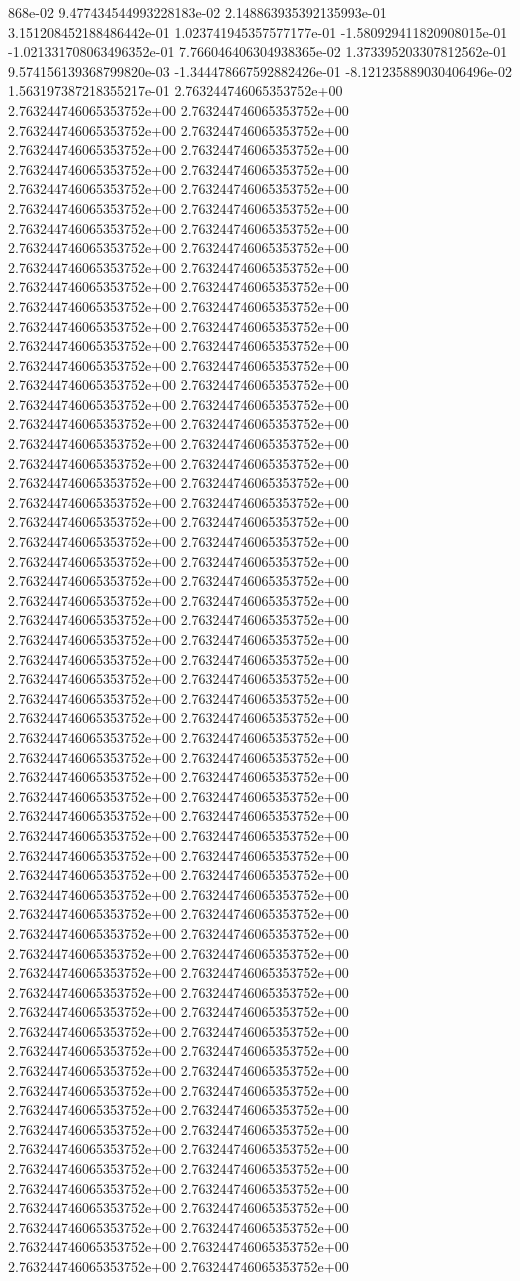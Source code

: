868e-02	9.477434544993228183e-02	2.148863935392135993e-01	3.151208452188486442e-01	1.023741945357577177e-01	-1.580929411820908015e-01	-1.021331708063496352e-01	7.766046406304938365e-02	1.373395203307812562e-01	9.574156139368799820e-03	-1.344478667592882426e-01	-8.121235889030406496e-02	1.563197387218355217e-01
2.763244746065353752e+00	2.763244746065353752e+00	2.763244746065353752e+00	2.763244746065353752e+00	2.763244746065353752e+00	2.763244746065353752e+00	2.763244746065353752e+00	2.763244746065353752e+00	2.763244746065353752e+00	2.763244746065353752e+00	2.763244746065353752e+00	2.763244746065353752e+00	2.763244746065353752e+00	2.763244746065353752e+00	2.763244746065353752e+00	2.763244746065353752e+00	2.763244746065353752e+00	2.763244746065353752e+00	2.763244746065353752e+00	2.763244746065353752e+00	2.763244746065353752e+00	2.763244746065353752e+00	2.763244746065353752e+00	2.763244746065353752e+00	2.763244746065353752e+00	2.763244746065353752e+00	2.763244746065353752e+00	2.763244746065353752e+00	2.763244746065353752e+00	2.763244746065353752e+00	2.763244746065353752e+00	2.763244746065353752e+00	2.763244746065353752e+00	2.763244746065353752e+00	2.763244746065353752e+00	2.763244746065353752e+00	2.763244746065353752e+00	2.763244746065353752e+00	2.763244746065353752e+00	2.763244746065353752e+00	2.763244746065353752e+00	2.763244746065353752e+00	2.763244746065353752e+00	2.763244746065353752e+00	2.763244746065353752e+00	2.763244746065353752e+00	2.763244746065353752e+00	2.763244746065353752e+00	2.763244746065353752e+00	2.763244746065353752e+00	2.763244746065353752e+00	2.763244746065353752e+00	2.763244746065353752e+00	2.763244746065353752e+00	2.763244746065353752e+00	2.763244746065353752e+00	2.763244746065353752e+00	2.763244746065353752e+00	2.763244746065353752e+00	2.763244746065353752e+00	2.763244746065353752e+00	2.763244746065353752e+00	2.763244746065353752e+00	2.763244746065353752e+00	2.763244746065353752e+00	2.763244746065353752e+00	2.763244746065353752e+00	2.763244746065353752e+00	2.763244746065353752e+00	2.763244746065353752e+00	2.763244746065353752e+00	2.763244746065353752e+00	2.763244746065353752e+00	2.763244746065353752e+00	2.763244746065353752e+00	2.763244746065353752e+00	2.763244746065353752e+00	2.763244746065353752e+00	2.763244746065353752e+00	2.763244746065353752e+00	2.763244746065353752e+00	2.763244746065353752e+00	2.763244746065353752e+00	2.763244746065353752e+00	2.763244746065353752e+00	2.763244746065353752e+00	2.763244746065353752e+00	2.763244746065353752e+00	2.763244746065353752e+00	2.763244746065353752e+00	2.763244746065353752e+00	2.763244746065353752e+00	2.763244746065353752e+00	2.763244746065353752e+00	2.763244746065353752e+00	2.763244746065353752e+00	2.763244746065353752e+00	2.763244746065353752e+00	2.763244746065353752e+00	2.763244746065353752e+00	2.763244746065353752e+00	2.763244746065353752e+00	2.763244746065353752e+00	2.763244746065353752e+00	2.763244746065353752e+00	2.763244746065353752e+00	2.763244746065353752e+00	2.763244746065353752e+00	2.763244746065353752e+00	2.763244746065353752e+00	2.763244746065353752e+00	2.763244746065353752e+00	2.763244746065353752e+00	2.763244746065353752e+00	2.763244746065353752e+00	2.763244746065353752e+00	2.763244746065353752e+00	2.763244746065353752e+00	2.763244746065353752e+00	2.763244746065353752e+00	2.763244746065353752e+00